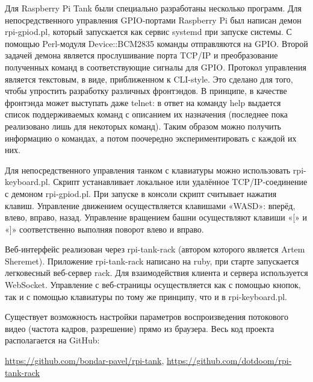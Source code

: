 \documentclass[10pt, a5paper]{article}
\begin{document}
Для Raspberry Pi Tank были специально разработаны несколько программ.
Для непосредственного управления GPIO-портами Raspberry Pi был написан демон  rpi-gpiod.pl, который запускается как сервис systemd при запуске системы. С помощью Perl-модуля Device::BCM2835 команды отправляются на GPIO. Второй задачей демона является прослушивание порта TCP/IP  и преобразование полученных команд в соответствующие сигналы для GPIO. Протокол управления является текстовым, в виде, приближенном к CLI-style. Это сделано для того, чтобы упростить разработку различных фронтэндов. В принципе, в качестве фронтэнда может выступать даже telnet: в ответ на команду help выдается список поддерживаемых команд с описанием их назначения (последнее пока реализовано лишь для некоторых команд). Таким образом можно получить информацию о командах, а потом поочередно экспериментировать с каждой их них.

%

Для непосредственного управления танком с клавиатуры можно использовать rpi-keyboard.pl. Скрипт устанавливает локальное или удалённое TCP/IP-соединение с демоном rpi-gpiod.pl.  При запуске в консоли скрипт считывает нажатия клавиш. Управление движением осуществляется клавишами «WASD»: вперёд, влево, вправо, назад. Управление вращением башни осуществляют клавиши «[» и «]» соответственно выполняя поворот влево и вправо.

Веб-интерфейс реализован через rpi-tank-rack (автором которого является Artem Sheremet). Приложение rpi-tank-rack написано на ruby, при старте запускается легковесный веб-сервер rack. Для взаимодействия клиента и сервера используется WebSocket. Управление с  веб-страницы осуществляется как с помощью кнопок, так и с помощью клавиатуры по тому же принципу, что и в rpi-keyboard.pl.

Существует возможность настройки параметров воспроизведения потокового видео (частота кадров, разрешение) прямо из браузера.
Весь код проекта располагается на GitHub:

\url{https://github.com/bondar-pavel/rpi-tank}, \url{https://github.com/dotdoom/rpi-tank-rack}
\end{document}
